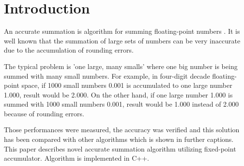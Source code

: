 \documentclass[conference]{IEEEtran}
\begin{document}
%
\IEEEpeerreviewmaketitle


\section{Introduction}
An accurate summation \cite{Higham} is algorithm for summing 
floating-point numbers \cite{WhatShouldKnowAboutFP}. It is well known that the summation 
of large sets of numbers can be very inaccurate due
to the accumulation of rounding errors. 
\par
The typical problem is 'one large, many smalls' \cite{ComparisonOfMethods} 
where one big number is being summed with many small numbers. 
For example, in four-digit decade floating-point space,
if 1000 small numbers 0.001 is accumulated to one large 
number 1.000, result would be 2.000. On the other hand,
if one large number 1.000 is summed with 1000 small numbers 0.001,
result would be 1.000 instead of 2.000 because of rounding errors.
\par
Those performances were measured, the accuracy was verified and this 
solution has been compared with other algorithms which is 
shown in further captions. This paper describes novel accurate 
summation algorithm utilizing fixed-point accumulator.
Algorithm is implemented in C++.
\end{document}
